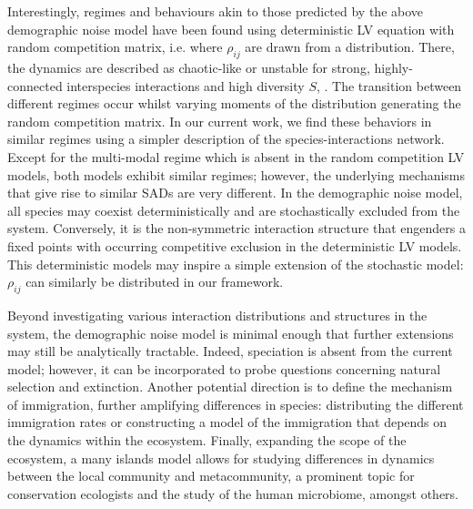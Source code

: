 \documentclass[9pt,twocolumn,twoside,lineno]{pnas-new}
\begin{document}
Interestingly, regimes and behaviours akin to those predicted by the above demographic noise model have been found using deterministic LV equation with random competition matrix, i.e. where $\rho_{ij}$ are drawn from a distribution.
There, the dynamics are described as chaotic-like or unstable for strong, highly-connected interspecies interactions and high diversity $S$, \cite{may1972will,allesina2008network,allesina2012stability}.
The transition between different regimes occur whilst varying moments of the distribution generating the random competition matrix.
In our current work, we find these behaviors in similar regimes using a simpler description of the species-interactions network.%
Except for the multi-modal regime which is absent in the random competition LV models, both models exhibit similar regimes; however, the underlying mechanisms that give rise to similar SADs are very different.
In the demographic noise model, all species may coexist deterministically and are stochastically excluded from the system.
Conversely, it is the non-symmetric interaction structure that engenders a fixed points with occurring competitive exclusion in the deterministic LV models.
This deterministic models may inspire a simple extension of the stochastic model: $\rho_{ij}$ can similarly be distributed %
in our framework.


Beyond investigating various interaction distributions and structures in the system, the demographic noise model is minimal enough that further extensions may still be analytically tractable.
Indeed, speciation is absent from the current model; however, it can be incorporated to probe questions concerning natural selection and extinction.
Another potential direction is to define the mechanism of immigration, further amplifying differences in species: distributing the different immigration rates or constructing a model of the immigration that depends on the dynamics within the ecosystem.
Finally, expanding the scope of the ecosystem, a many islands model allows for studying differences in dynamics between the local community and metacommunity, a prominent topic for conservation ecologists and the study of the human microbiome, amongst others.
 
\end{document}
